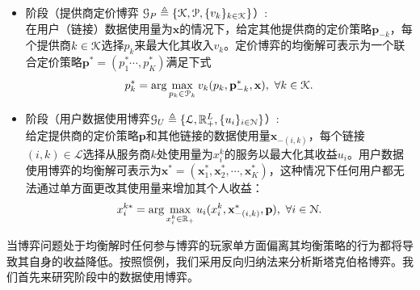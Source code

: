 \begin{df}\label{def:mlmf}
\mbox{}
\begin{itemize}
    \item 阶段\uppercase\expandafter{}（提供商定价博弈 $\mathcal{G}_P\triangleq\{\mathcal{K},\mathcal{P},\{v_k\}_{k\in\mathcal{K}}\}$）:\\
    在用户（链接）数据使用量为$\mathbf{x}$的情况下，给定其他提供商的定价策略$\mathbf{p}_{-k}$，每个提供商$k\in\mathcal{K}$选择$p_k$来最大化其收入$v_k$。定价博弈的均衡解可表示为一个联合定价策略$\mathbf{p}^*=(p^{*}_{1}\cdots,p^{*}_{K})$满足下式
        \begin{equation}
          p^*_k=\arg\max_{p_k\in\mathcal{P}_k}v_k(p_k,\mathbf{p}^{*}_{-k},\mathbf{x}), ~\forall k\in\mathcal{K}.
        \end{equation}
        
    \item 阶段\uppercase\expandafter{}（用户数据使用博弈$\mathcal{G}_U\triangleq\{\mathcal{L},\mathbb{R}_+^L,\{u_i\}_{i\in\mathcal{N}}\}$）:\\
    给定提供商的定价策略$\mathbf{p}$和其他链接的数据使用量$\mathbf{x}_{-(i,k)}$，每个链接$(i,k)\in\mathcal{L}$选择从服务商$k$处使用量为$x^{k}_i$的服务以最大化其收益$u_ {i}$。用户数据使用博弈的均衡解可表示为$\mathbf{x^*}=(\mathbf{x}^*_{1},\mathbf{x}^*_{2},\cdots,\mathbf{x}^*_{K})$，这种情况下任何用户都无法通过单方面更改其使用量来增加其个人收益：
        \begin{equation}
          x^{k*}_i=\arg\max_{x^{k}_i\in \mathbb{R}_+}u_i(x^{k}_i,\mathbf{x}^*_{-(i,k)},\mathbf{p}), ~\forall i\in\mathcal{N}.
        \end{equation}
\end{itemize}
\end{df}

当博弈问题处于均衡解时任何参与博弈的玩家单方面偏离其均衡策略的行为都将导致其自身的收益降低。按照惯例，我们采用反向归纳法\cite{osborne}来分析斯塔克伯格博弈。我们首先来研究阶段\uppercase\expandafter{}中的数据使用博弈。



